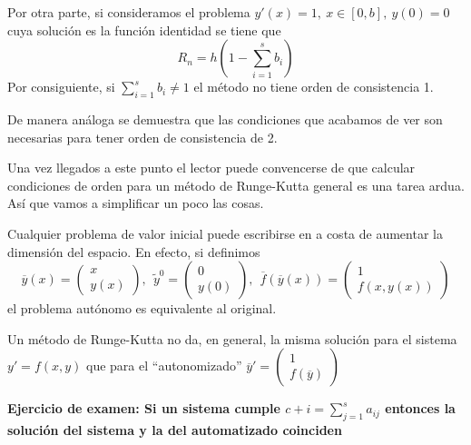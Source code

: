 Por otra parte, si consideramos el problema $y'(x)=1, \ x\in [0,b], \ y(0)=0$ cuya solución es la función identidad se tiene que
\[R_n=h\left( 1 - \sum_{i=1}^sb_i\right)\]
Por consiguiente, si $\sum_{i=1}^sb_i\neq 1$ el método no tiene orden de consistencia 1.

De manera análoga se demuestra que las condiciones que acabamos de ver son necesarias para tener orden de consistencia de 2.

Una vez llegados a este punto el lector puede convencerse de que calcular condiciones de orden para un método de Runge-Kutta general es una tarea ardua. Así que vamos a simplificar un poco las cosas.

Cualquier problema de valor inicial puede escribirse en  a costa de aumentar la dimensión del espacio. En efecto, si definimos
\[\overline{y}(x)=\left(\begin{array}{c} x \\ y(x)\end{array}\right), \ \ \tilde{y}^0 = \left(\begin{array}{c} 0 \\ y(0)\end{array}\right), \ \ \overline{f}(\overline{y}(x)) = \left(\begin{array}{c} 1 \\ f(x,y(x))\end{array}\right)\]
el problema autónomo es equivalente al original.

\obs Un método de Runge-Kutta no da, en general, la misma solución para el sistema $y'=f(x,y)$ que para el ``autonomizado'' $\overline{y}'= \left( \begin{array}{c}1 \\ f(\overline{y}) \end{array}\right)$

\textbf{Ejercicio de examen: Si un sistema cumple $c+i = \sum_{j=1}^sa_{ij}$ entonces la solución del sistema y la del automatizado coinciden}

